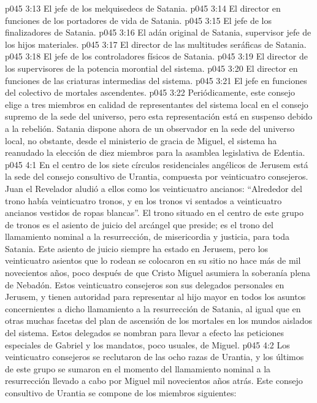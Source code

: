 \vs p045 3:13 El jefe de los melquisedecs de Satania.
\vs p045 3:14 El director en funciones de los portadores de vida de Satania.
\vs p045 3:15 El jefe de los finalizadores de Satania.
\vs p045 3:16 El adán original de Satania, supervisor jefe de los hijos materiales.
\vs p045 3:17 El director de las multitudes seráficas de Satania.
\vs p045 3:18 El jefe de los controladores físicos de Satania.
\vs p045 3:19 El director de los supervisores de la potencia morontial del sistema.
\vs p045 3:20 El director en funciones de las criaturas intermedias del sistema.
\vs p045 3:21 El jefe en funciones del colectivo de mortales ascendentes.
\vs p045 3:22 \pc Periódicamente, este consejo elige a tres miembros en calidad de representantes del sistema local en el consejo supremo de la sede del universo, pero esta representación está en suspenso debido a la rebelión. Satania dispone ahora de un observador en la sede del universo local, no obstante, desde el ministerio de gracia de Miguel, el sistema ha reanudado la elección de diez miembros para la asamblea legislativa de Edentia.
\vs p045 4:1 En el centro de los siete círculos residenciales angélicos de Jerusem está la sede del consejo consultivo de Urantia, compuesta por veinticuatro consejeros. Juan el Revelador aludió a ellos como los veinticuatro ancianos: “Alrededor del trono había veinticuatro tronos, y en los tronos vi sentados a veinticuatro ancianos vestidos de ropas blancas”. El trono situado en el centro de este grupo de tronos es el asiento de juicio del arcángel que preside; es el trono del llamamiento nominal a la resurrección, de misericordia y justicia, para toda Satania. Este asiento de juicio siempre ha estado en Jerusem, pero los veinticuatro asientos que lo rodean se colocaron en su sitio no hace más de mil novecientos años, poco después de que Cristo Miguel asumiera la soberanía plena de Nebadón. Estos veinticuatro consejeros son sus delegados personales en Jerusem, y tienen autoridad para representar al hijo mayor en todos los asuntos concernientes a dicho llamamiento a la resurrección de Satania, al igual que en otras muchas facetas del plan de ascensión de los mortales en los mundos aislados del sistema. Estos delegados se nombran para llevar a efecto las peticiones especiales de Gabriel y los mandatos, poco usuales, de Miguel.
\vs p045 4:2 Los veinticuatro consejeros se reclutaron de las ocho razas de Urantia, y los últimos de este grupo se sumaron en el momento del llamamiento nominal a la resurrección llevado a cabo por Miguel mil novecientos años atrás. Este consejo consultivo de Urantia se compone de los miembros siguientes:
